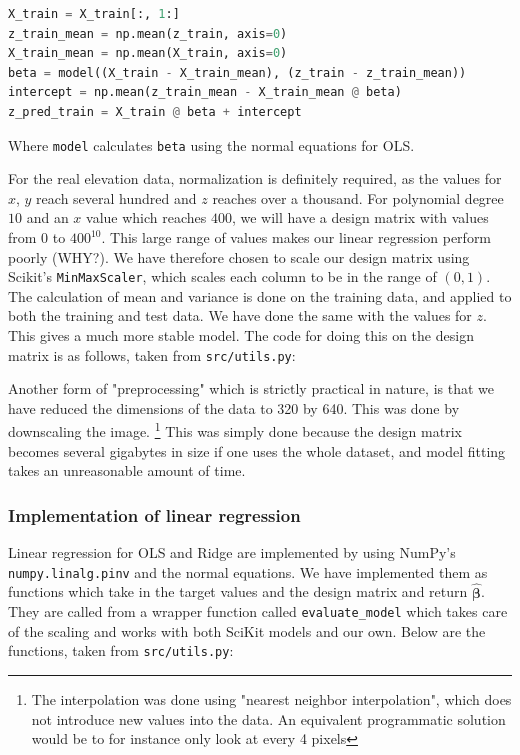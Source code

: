 \documentclass[twocolumn,10pt,cleanfoot]{asme2ej}
\begin{document}
\begin{lstlisting}[language=Python]
X_train = X_train[:, 1:]
z_train_mean = np.mean(z_train, axis=0)
X_train_mean = np.mean(X_train, axis=0)
beta = model((X_train - X_train_mean), (z_train - z_train_mean))
intercept = np.mean(z_train_mean - X_train_mean @ beta)
z_pred_train = X_train @ beta + intercept
\end{lstlisting}

Where \texttt{model} calculates \texttt{beta} using the normal equations for OLS.

For the real elevation data, normalization is definitely required, as the values for $x$, $y$ reach several hundred and $z$ reaches over a thousand. For polynomial degree $10$ and an $x$ value which reaches $400$, we will have a design matrix with values from $0$ to $400^{10}$. This large range of values makes our linear regression perform poorly (WHY?). We have therefore chosen to scale our design matrix using Scikit's \texttt{MinMaxScaler}, which scales each column to be in the range of $(0,1)$. The calculation of mean and variance is done on the training data, and applied to both the training and test data. We have done the same with the values for $z$. This gives a much more stable model. The code for doing this on the design matrix is as follows, taken from \texttt{src/utils.py}:



Another form of "preprocessing" which is strictly practical in nature, is that we have reduced the dimensions of the data to 320 by 640. This was done by downscaling the image. \footnote{The interpolation was done using "nearest neighbor interpolation", which does not introduce new values into the data. An equivalent programmatic solution would be to for instance only look at every 4 pixels} This was simply done because the design matrix becomes several gigabytes in size if one uses the whole dataset, and model fitting takes an unreasonable amount of time.


\subsubsection{Implementation of linear regression}

Linear regression for OLS and Ridge are implemented by using NumPy's \texttt{numpy.linalg.pinv} and the normal equations. We have implemented them as functions which take in the target values and the design matrix and return $\bm{\hat{\beta}}$. They are called from a wrapper function called \texttt{evaluate\_model} which takes care of the scaling and works with both SciKit models and our own. Below are the functions, taken from \texttt{src/utils.py}:
\end{document}
